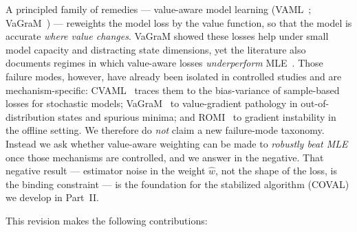 \documentclass{article}
\theoremstyle{plain}
\begin{document}
A principled family of remedies --- value-aware model learning
(VAML~\citep{farahmand2017vaml,farahmand2018itervaml}; VaGraM~\citep{voelcker2022vagram})
--- reweights the model loss by the value function, so that the model is accurate
\emph{where value changes}. VaGraM showed these losses help under small model capacity
and distracting state dimensions, yet the literature also documents regimes in which
value-aware losses \emph{underperform} MLE~\citep{voelcker2022vagram,cvaml2025,romi2026}.
Those failure modes, however, have already been isolated in controlled studies and are
mechanism-specific: CVAML~\citep{cvaml2025} traces them to the bias-variance of
sample-based losses for stochastic models; VaGraM~\citep{voelcker2022vagram} to
value-gradient pathology in out-of-distribution states and spurious minima; and
ROMI~\citep{romi2026} to gradient instability in the offline setting. We therefore do
\emph{not} claim a new failure-mode taxonomy. Instead we ask whether value-aware
weighting can be made to \emph{robustly beat MLE} once those mechanisms are controlled,
and we answer in the negative. That negative result --- estimator noise in the weight
$\hat{w}$, not the shape of the loss, is the binding constraint --- is the foundation for
the stabilized algorithm (COVAL) we develop in Part~II.

This revision makes the following contributions:
\end{document}
